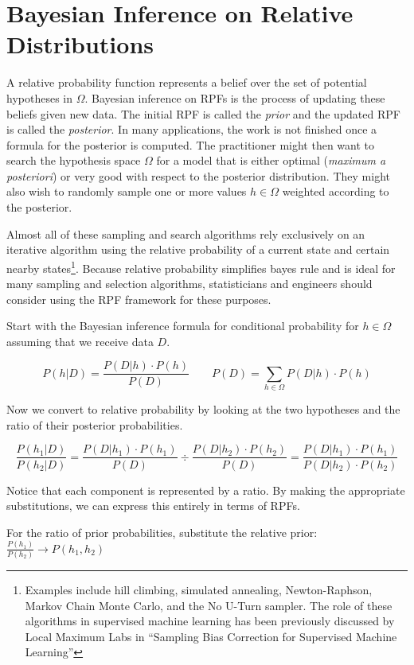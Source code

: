 \documentclass[twoside]{article}
\newcommand{\quotes}[1]{``#1''}
\theoremstyle{plain}%
\theoremstyle{definition}
\theoremstyle{remark}
\begin{document}
\section{Bayesian Inference on Relative Distributions}

A relative probability function represents a belief over the set of potential hypotheses in \(\Omega\). Bayesian inference on RPFs is the process of updating these beliefs given new data. The initial RPF is called the \textit{prior} and the updated RPF is called the \textit{posterior}. In many applications, the work is not finished once a formula for the posterior is computed. The practitioner might then want to search the hypothesis space \(\Omega\) for a model that is either optimal (\textit{maximum a posteriori}) or very good with respect to the posterior distribution. They might also wish to randomly sample one or more values \(h \in \Omega\) weighted according to the posterior.

Almost all of these sampling and search algorithms rely exclusively on an iterative algorithm using the relative probability of a current state and certain nearby states\footnote{Examples include hill climbing, simulated annealing, Newton-Raphson, Markov Chain Monte Carlo, and the No U-Turn sampler. The role of these algorithms in supervised machine learning has been previously discussed by Local Maximum Labs in \quotes{Sampling Bias Correction for Supervised Machine Learning\cite{sklar_bias}}}. Because relative probability simplifies bayes rule and is ideal for many sampling and selection algorithms, statisticians and engineers should consider using the RPF framework for these purposes.

Start with the Bayesian inference formula for conditional probability for \(h \in \Omega\) assuming that we receive data \(D\).

\[P(h|D) = \frac{P(D|h) \cdot P(h)}{P(D)} \qquad P(D) = \sum_{h \in \Omega} P(D|h) \cdot P(h)\]

Now we convert to relative probability by looking at the two hypotheses and the ratio of their posterior probabilities.

\[\frac{P(h_1|D)}{P(h_2| D)} = \frac{P(D|h_1) \cdot P(h_1)}{P(D)} \div \frac{P(D|h_2) \cdot P(h_2)}{P(D)} = \frac{P(D|h_1) \cdot P(h_1)}{P(D|h_2) \cdot P(h_2)} \]

Notice that each component is represented by a ratio. By making the appropriate substitutions, we can express this entirely in terms of RPFs.

For the ratio of prior probabilities, substitute the relative prior: \(\frac{P(h_1)}{P(h_2)} \rightarrow P(h_1, h_2) \)
\end{document}
